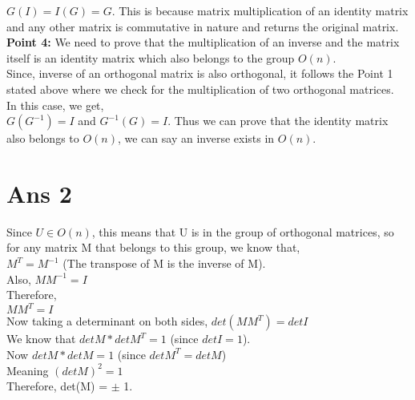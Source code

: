 \documentclass[10pt]{article}
\begin{document}
\begin{flushleft}
\vspace{0.5em}
$G (I) = I (G) = G$. This is because matrix multiplication of an identity matrix and any other matrix is commutative in nature and returns the original matrix. \\
\vspace{0.5em}
\textbf{Point 4:}
We need to prove that the multiplication of an inverse and the matrix itself is an identity matrix which also belongs to the group $O(n)$.\\
Since, inverse of an orthogonal matrix is also orthogonal, it follows the Point 1 stated above where we check for the multiplication of two orthogonal matrices. \\
In this case, we get,\\
$G (G^{-1}) = I$ and $G^{-1} (G) = I$. Thus we can prove that the identity matrix also belongs to $O(n)$, we can say an inverse exists in $O(n)$.
\end{flushleft}
\section*{Ans 2}
\begin{flushleft}
Since $U \in O(n)$, this means that U is in the group of orthogonal matrices, so for any matrix M that belongs to this group, we know that, \\
\vspace{0.5em}
$M^{T} = M^{-1}$ (The transpose of M is the inverse of M). \\
\vspace{0.5em}
Also, $M M^{-1} = I$\\
\vspace{0.5em}
Therefore, \\
\vspace{0.5em}
$M M^{T} = I$ \\
\vspace{0.5em}
Now taking a determinant on both sides,
\vspace{0.5em}
$det ( M M^{T}) = det I$\\
\vspace{0.5em}
We know that $det M * det M^{T} = 1$ (since $det I = 1$).\\
\vspace{0.5em}
Now $det M * det M = 1$ (since $det M^{T} = det M$)\\
\vspace{0.5em}
Meaning $(det M)^{2} = 1$\\
\vspace{0.5em}
Therefore, det(M) = $\pm$ 1.
\end{flushleft}
\end{document}
